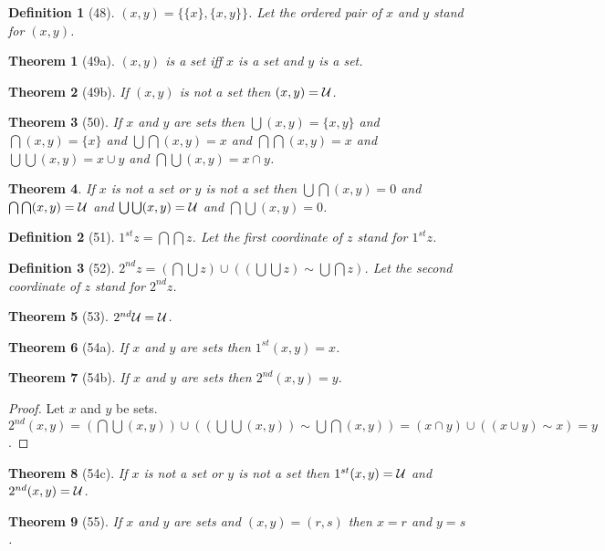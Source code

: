 \documentclass{scrartcl}
\newenvironment{forthel}{\begin{leftbar}}{\end{leftbar}}
\newtheorem*{theorem}{Theorem}
\newtheorem*{definition}{Definition}
\newcommand{\sing}[1]{\{{#1}\}}
\newcommand{\pair}[2]{\{{#1},{#2}\}}
\newcommand{\op}[2]{({#1},{#2})}
\begin{document}
\begin{forthel}

\begin{definition}[48] $\op{x}{y} = \pair{\sing{x}}{\pair{x}{y}}$.
Let the \emph{ordered pair} of $x$ and $y$ stand for $\op{x}{y}$.
\end{definition}

\begin{theorem}[49a] $\op{x}{y}$ is a set iff $x$ is a set and $y$ is a set.
\end{theorem}

\begin{theorem}[49b] If $\op{x}{y}$ is not a set then $\op{x}{y} = {\cal U}$.
\end{theorem}

\begin{theorem}[50] If $x$ and $y$ are sets then 
  $\bigcup \op{x}{y} = \pair{x}{y}$ and   
  $\bigcap \op{x}{y} = \sing{x}$ and
  $\bigcup \bigcap \op{x}{y} = x$ and
  $\bigcap \bigcap \op{x}{y} = x$ and 
  $\bigcup \bigcup \op{x}{y} = x \cup y$ and
  $\bigcap \bigcup \op{x}{y} = x \cap y$.
\end{theorem}  

\begin{theorem} If $x$ is not a set or $y$ is not a set then
  $\bigcup \bigcap \op{x}{y} = 0$ and
  $\bigcap \bigcap \op{x}{y} = {\cal U}$ and
  $\bigcup \bigcup \op{x}{y} = {\cal U}$ and
  $\bigcap \bigcup \op{x}{y} = 0$.
\end{theorem}

\begin{definition}[51] $1^{st} z = \bigcap \bigcap z$.
Let the \emph{first coordinate} of $z$ stand for $1^{st} z$.
\end{definition}

\begin{definition}[52] $2^{nd} z = 
(\bigcap \bigcup z) \cup ((\bigcup \bigcup z) \sim \bigcup \bigcap z)$. 
Let the \emph{second coordinate} of $z$ stand for $2^{nd} z$.
\end{definition}

\begin{theorem}[53] $2^{nd} {\cal U} = {\cal U}$.
\end{theorem}

\begin{theorem}[54a] If $x$ and $y$ are sets then $1^{st} \op{x}{y} = x$.
\end{theorem}
\begin{theorem}[54b] If $x$ and $y$ are sets then $2^{nd} \op{x}{y} = y$.
\end{theorem}
\begin{proof} Let $x$ and $y$ be sets.
$2^{nd} \op{x}{y} = (\bigcap \bigcup \op{x}{y}) \cup 
((\bigcup \bigcup \op{x}{y}) \sim \bigcup \bigcap \op{x}{y})
= (x \cap y) \cup ((x \cup y) \sim x)
= y$.
\end{proof}
\begin{theorem}[54c] If $x$ is not a set or $y$ is not a set then
$1^{st} \op{x}{y} = {\cal U}$ and $2^{nd} \op{x}{y} = {\cal U}$.
\end{theorem}

\begin{theorem}[55] If $x$ and $y$ are sets and $\op{x}{y}=\op{r}{s}$ then
$x = r$ and $y = s$.
\end{theorem}

\end{forthel}
\end{document}
